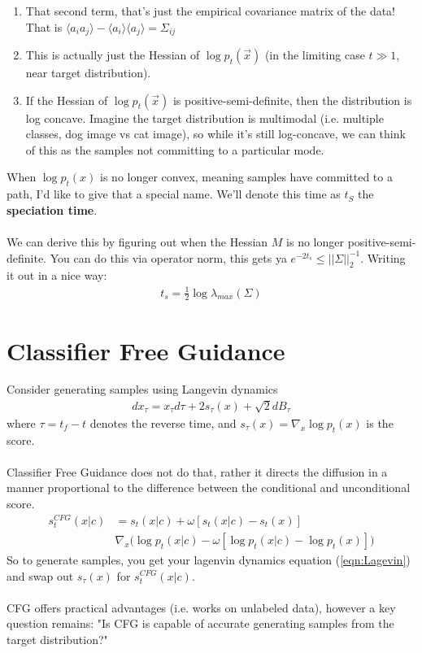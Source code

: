 \documentclass[12pt,fleqn]{article}
\numberwithin{equation}{section} %
\begin{document}
\begin{enumerate}
	\item That second term, that's just the empirical covariance matrix of the data! That is $\langle a_i a_j\rangle - \langle a_i \rangle \langle a_j\rangle = \Sigma_{ij}$
	\item This is actually just the Hessian of $\log p_t(\vec x)$ (in the limiting case $t \gg 1$, near target distribution). 
	\item If the Hessian of $\log p_t(\vec x)$ is positive-semi-definite, then the distribution is log concave. Imagine the target distribution is multimodal (i.e. multiple classes, dog image vs cat image), so while it's still log-concave, we can think of this as the samples not committing to a particular mode.
\end{enumerate}
When $\log p_t(x)$ is no longer convex, meaning samples have committed to a path, I'd like to give that a special name. We'll denote this time as $t_S$ the \textbf{speciation time}. \\
\\
We can derive this by figuring out when the Hessian $M$ is no longer positive-semi-definite. You can do this via operator norm, this gets ya $e^{-2t_s} \leq || \Sigma||_2^{-1}$. Writing it out in a nice way:
\begin{align}
	\boxed{t_s = \frac{1}{2} \log \lambda_{max}(\Sigma)}
\end{align}

\section{Classifier Free Guidance}
Consider generating samples using Langevin dynamics
\begin{align}
	dx_\tau = x_\tau d\tau + 2 s_\tau (x) + \sqrt{2} dB_\tau \label{eqn:Lagevin}
\end{align}
where $\tau = t_f - t$ denotes the reverse time, and $s_\tau(x) =\nabla_x \log p_t(x)$ is the score.\\
\\
Classifier Free Guidance does not do that, rather it directs the diffusion in a manner proportional to the difference between the conditional and unconditional score.
\begin{align}
	s^{CFG}_t(x | c) & = s_t(x | c)+ \omega [s_t(x | c) - s_t(x)]\\
	& \nabla_x \big(\log p_t(x|c) - \omega [\log p_t(x|c) - \log  p_t(x)]\big)
\end{align}
So to generate samples, you get your lagenvin dynamics equation (\ref{eqn:Lagevin}) and swap out $s_\tau(x)$ for $s^{CFG}_t(x | c)$.\\
\\
CFG offers practical advantages (i.e. works on unlabeled data), however  a key question remains: "Is CFG is capable of accurate generating samples from the target distribution?"
\end{document}
